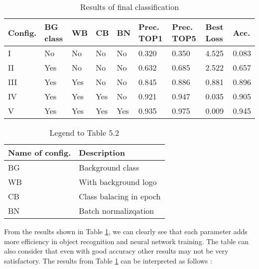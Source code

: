 \begin{table}[hbp]
	\centering
	\caption{Results of final classification}
	\label{tab:sample}
	\begin{tabular}{lllll|llll}
		\toprule
		Config.		 	& BG class 	& WB 	& CB 	& BN 	& Prec. TOP1 	& Prec. TOP5 	& 	Best Loss  	& Acc.	\\ \midrule
		I 			  	& No 		& No	& No 	& No 	& 0.320			& 0.350 		& 	4.525		& 0.083	\\
		II 			  	& Yes 		& No	& No 	& No 	& 0.632			& 0.685 		& 	2.522		& 0.657	\\
		III 			& Yes 		& Yes	& No 	& No 	& 0.845			& 0.886 		& 	0.881		& 0.896	\\
		IV 				& Yes 		& Yes	& Yes 	& No 	& 0.921			& 0.947 		& 	0.035		& 0.905	\\
		V 				& Yes		& Yes	& Yes	& Yes	& 0.935			& 0.975			& 	0.009		& 0.945	\\
		\bottomrule
	\end{tabular}
\end{table}

\begin{table}
	\centering
	\caption{Legend to Table 5.2}
	\begin{tabular}{ll}
		\toprule
		Name of config. & Description 				\\ \midrule
		BG 				& Background class 			\\
		WB				& With background logo 		\\
		CB 				& Class balacing in epoch 	\\
		BN 				& Batch normalizqation		\\
		\bottomrule
	\end{tabular}
	
\end{table}


\noindent From the results shown in Table \ref{tab:sample}, we can clearly see that each parameter adds more efficiency in object recognition and neural network training. The table can also consider that even with good accuracy other results may not be very satisfactory. The results from Table \ref{tab:sample} can be interpreted as follows :

\vspace{-0.3cm}

\vspace{-0.3cm}

